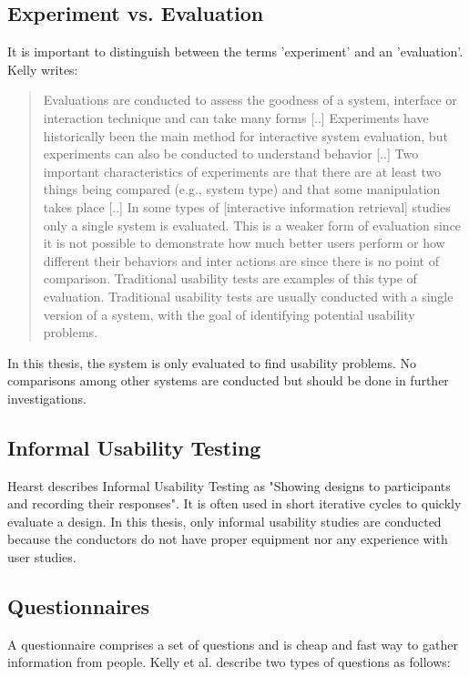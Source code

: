 \documentclass[11pt]{report}
\begin{document}
\subsection{Experiment vs. Evaluation}

It is important to distinguish between the terms 'experiment' and an 'evaluation'. Kelly \cite{Kelly2007} writes:
\begin{quote}
Evaluations are conducted to assess the goodness of a system, interface or interaction technique and can take many forms [..] Experiments have historically been the main method for interactive system evaluation, but experiments can also be conducted to understand behavior [..] Two important characteristics of experiments are that there are at least two things being compared (e.g., system type) and that some manipulation takes place [..] In some types of [interactive information retrieval] studies only a single system is evaluated. This is a weaker form of evaluation since it is not possible to demonstrate how much better users perform or how different their behaviors and inter actions are since there is no point of comparison. Traditional usability tests are examples of this type of evaluation. Traditional usability tests are usually conducted with a single version of a system, with the goal of identifying potential usability problems.	
\end{quote}

In this thesis, the system is only evaluated to find usability problems. No comparisons among other systems are conducted but should be done in further investigations.

\subsection{Informal Usability Testing}

Hearst \cite{Hearst2009} describes Informal Usability Testing as "Showing designs to participants and recording their responses". It is often used in short iterative cycles to quickly evaluate a design. In this thesis, only informal usability studies are conducted because the conductors do not have proper equipment nor any experience with user studies.

\subsection{Questionnaires}

A questionnaire comprises a set of questions and is cheap and fast way to gather information from people. Kelly et al. \cite{Kelly2008} describe two types of questions as follows:
\end{document}

